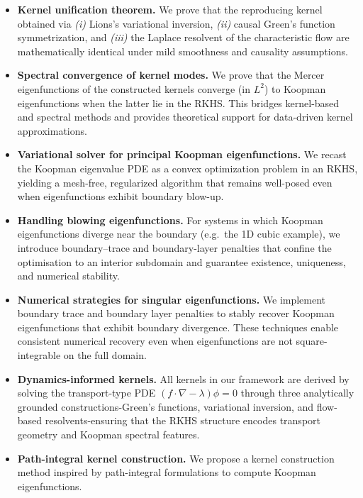 \documentclass[11pt]{article}
\theoremstyle{plain}
\begin{document}
\begin{itemize}
  \item \textbf{Kernel unification theorem.} We prove that the reproducing kernel obtained via
        \emph{(i)} Lions’s variational inversion, \emph{(ii)} causal Green’s function symmetrization,
        and \emph{(iii)} the Laplace resolvent of the characteristic flow are mathematically identical
        under mild smoothness and causality assumptions.

  \item \textbf{Spectral convergence of kernel modes.} We prove that the Mercer eigenfunctions of the constructed kernels converge (in \(L^2\)) to Koopman eigenfunctions when the latter lie in the RKHS. This bridges kernel-based and spectral methods and provides theoretical support for data-driven kernel approximations.

  \item \textbf{Variational solver for principal Koopman eigenfunctions.} We recast the Koopman
        eigenvalue PDE as a convex optimization problem in an RKHS, yielding a mesh-free,
        regularized algorithm that remains well-posed even when eigenfunctions exhibit boundary
        blow-up.

  \item \textbf{Handling blowing eigenfunctions.} For systems in which Koopman eigenfunctions diverge
        near the boundary (e.g.\ the 1D cubic example), we introduce boundary–trace and boundary-layer
        penalties that confine the optimisation to an interior subdomain and guarantee existence,
        uniqueness, and numerical stability.
\item \textbf{Numerical strategies for singular eigenfunctions.} We implement boundary trace and boundary layer penalties to stably recover Koopman eigenfunctions that exhibit boundary divergence. These techniques enable consistent numerical recovery even when eigenfunctions are not square-integrable on the full domain.


  \item \textbf{Dynamics-informed kernels.} All kernels in our framework are derived by solving the transport-type PDE \( (f \cdot \nabla - \lambda)\phi = 0 \) through three analytically grounded constructions-Green’s functions, variational inversion, and flow-based resolvents-ensuring that the RKHS structure encodes transport geometry and Koopman spectral features.

\item \textbf{Path-integral kernel construction.} We propose a kernel construction method inspired by path-integral formulations to compute Koopman eigenfunctions.



\end{itemize}
\end{document}
